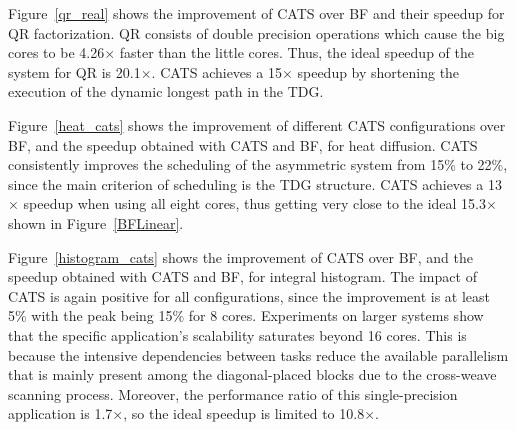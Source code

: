 
Figure~\ref{qr_real} shows the improvement of CATS over BF and their speedup for QR factorization. 
QR consists of double precision operations which cause the big cores to be 4.26$\times$ faster than the little cores. Thus, the ideal speedup of the system for QR is 20.1$\times$. 
CATS achieves a 15$\times$ speedup by shortening the execution of the dynamic longest path in the TDG. 

Figure~\ref{heat_cats} shows the improvement of different CATS configurations over BF, and the speedup obtained with CATS and BF, for heat diffusion. 
CATS consistently improves the scheduling of the asymmetric system from 15\% to 22\%, since the main criterion of scheduling is the TDG structure. 
CATS achieves a 13$\times$ speedup when using all eight cores, thus getting very close to the ideal 15.3$\times$ shown in Figure~\ref{BFLinear}.

Figure~\ref{histogram_cats} shows the improvement of CATS over BF, and the speedup obtained with CATS and BF, for integral histogram. 
The impact of CATS is again positive for all configurations, since the improvement is at least 5\% with the peak being 15\% for 8 cores. 
Experiments on larger systems show that the specific application's scalability saturates beyond 16 cores. 
This is because the intensive dependencies between tasks reduce the available parallelism that is mainly present among the diagonal-placed blocks due to the cross-weave scanning process. 
Moreover, the performance ratio of this single-precision application is 1.7$\times$, so the ideal speedup is limited to 10.8$\times$.

